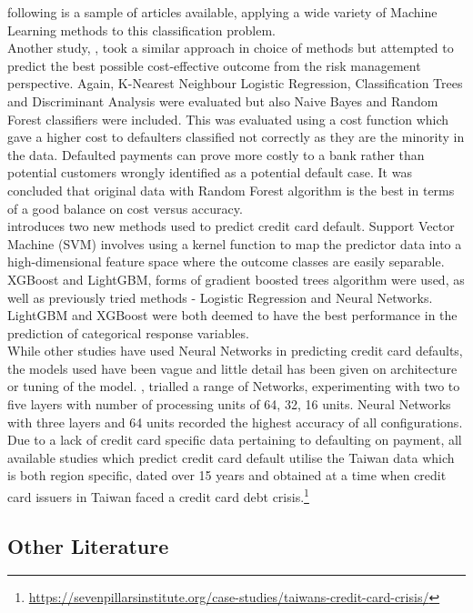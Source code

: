 \documentclass[
]{article}
\begin{document}
following is a sample of articles available, applying a wide variety of
Machine Learning methods to this classification problem.\\
Another study, \citep{Neema2017TheCO}, took a similar approach in choice
of methods but attempted to predict the best possible cost-effective
outcome from the risk management perspective. Again, K-Nearest Neighbour
Logistic Regression, Classification Trees and Discriminant Analysis were
evaluated but also Naive Bayes and Random Forest classifiers were
included. This was evaluated using a cost function which gave a higher
cost to defaulters classified not correctly as they are the minority in
the data. Defaulted payments can prove more costly to a bank rather than
potential customers wrongly identified as a potential default case. It
was concluded that original data with Random Forest algorithm is the
best in terms of a good balance on cost versus accuracy.\\
\citet{Yang2018-rt} introduces two new methods used to predict credit
card default. Support Vector Machine (SVM) involves using a kernel
function to map the predictor data into a high-dimensional feature space
where the outcome classes are easily separable. XGBoost and LightGBM,
forms of gradient boosted trees algorithm were used, as well as
previously tried methods - Logistic Regression and Neural Networks.
LightGBM and XGBoost were both deemed to have the best performance in
the prediction of categorical response variables.\\
While other studies have used Neural Networks in predicting credit card
defaults, the models used have been vague and little detail has been
given on architecture or tuning of the model. \citet{dnn2}, trialled a
range of Networks, experimenting with two to five layers with number of
processing units of 64, 32, 16 units. Neural Networks with three layers
and 64 units recorded the highest accuracy of all configurations.\\
\vspace{.5 cm} Due to a lack of credit card specific data pertaining to
defaulting on payment, all available studies which predict credit card
default utilise the Taiwan data which is both region specific, dated
over 15 years and obtained at a time when credit card issuers in Taiwan
faced a credit card debt crisis.\footnote{\url{https://sevenpillarsinstitute.org/case-studies/taiwans-credit-card-crisis/}}

\hypertarget{other-literature}{%
\subsection{Other Literature}\label{other-literature}}
\end{document}
